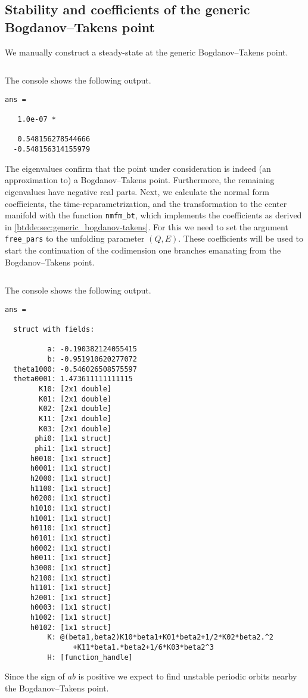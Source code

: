 \subsection{Stability and coefficients of the generic Bogdanov--Takens point}
We manually construct a steady-state at the generic Bogdanov--Takens point.
\inputminted[firstline=46, lastline=56]{MATLAB}{\pathToDDEBifToolDemos/neural_network_model/neural_network_model.m}
The \MATLAB console shows the following output.
\begin{verbatim}
ans =

   1.0e-07 *

   0.548156278544666
  -0.548156314155979
\end{verbatim}
The eigenvalues confirm that the point under consideration is indeed (an
approximation to) a Bogdanov--Takens point. Furthermore, the remaining eigenvalues have
negative real parts. Next, we calculate the normal form coefficients, the
time-reparametrization, and the transformation to the center manifold with the
function \texttt{nmfm_bt}, which implements the coefficients as derived in
\cref{btdde:sec:generic_bogdanov-takens}. For this we need to set the argument
\texttt{free_pars} to the unfolding parameter $(Q,E)$. These
coefficients will be used to start the continuation of the codimension one branches
emanating from the Bogdanov--Takens point.
\inputminted[firstline=58, lastline=62]{MATLAB}{\pathToDDEBifToolDemos/neural_network_model/neural_network_model.m}
The \MATLAB console shows the following output.
\begin{verbatim}
ans =

  struct with fields:

          a: -0.190382124055415
          b: -0.951910620277072
  theta1000: -0.546026508575597
  theta0001: 1.473611111111115
        K10: [2x1 double]
        K01: [2x1 double]
        K02: [2x1 double]
        K11: [2x1 double]
        K03: [2x1 double]
       phi0: [1x1 struct]
       phi1: [1x1 struct]
      h0010: [1x1 struct]
      h0001: [1x1 struct]
      h2000: [1x1 struct]
      h1100: [1x1 struct]
      h0200: [1x1 struct]
      h1010: [1x1 struct]
      h1001: [1x1 struct]
      h0110: [1x1 struct]
      h0101: [1x1 struct]
      h0002: [1x1 struct]
      h0011: [1x1 struct]
      h3000: [1x1 struct]
      h2100: [1x1 struct]
      h1101: [1x1 struct]
      h2001: [1x1 struct]
      h0003: [1x1 struct]
      h1002: [1x1 struct]
      h0102: [1x1 struct]
          K: @(beta1,beta2)K10*beta1+K01*beta2+1/2*K02*beta2.^2
                +K11*beta1.*beta2+1/6*K03*beta2^3
          H: [function_handle]
\end{verbatim}
Since the sign of $ab$ is positive we expect to find unstable periodic orbits nearby the 
Bogdanov--Takens point.

